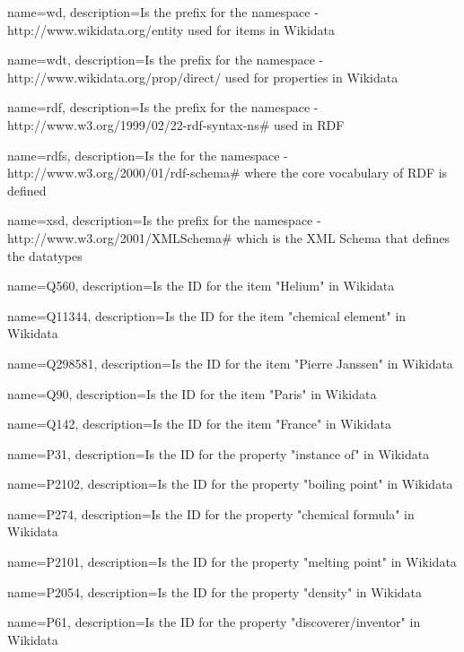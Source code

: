 \makeglossaries
{}
{
    name=wd,
    description={Is the prefix for the namespace - http://www.wikidata.org/entity used for items in Wikidata}
}

{
    name=wdt,
    description={Is the prefix for the namespace - http://www.wikidata.org/prop/direct/ used for properties in Wikidata}
}

{
    name=rdf,
    description={Is the prefix for the namespace - http://www.w3.org/1999/02/22-rdf-syntax-ns\# used in RDF}
}

{
    name=rdfs,
    description={Is the for the namespace - http://www.w3.org/2000/01/rdf-schema\# where the core vocabulary of RDF is defined}
}

{
    name=xsd,
    description={Is the prefix for the namespace - http://www.w3.org/2001/XMLSchema\# which is the XML Schema that defines the datatypes}
}

{
    name=Q560,
    description={Is the ID for the item "Helium" in Wikidata}
}

{
    name=Q11344,
    description={Is the ID for the item "chemical element" in Wikidata}
}

{
    name=Q298581,
    description={Is the ID for the item "Pierre Janssen" in Wikidata}
}

{
    name=Q90,
    description={Is the ID for the item "Paris" in Wikidata}
}

{
    name=Q142,
    description={Is the ID for the item "France" in Wikidata}
}

{
    name=P31,
    description={Is the ID for the property "instance of" in Wikidata}
}

{
    name=P2102,
    description={Is the ID for the property "boiling point" in Wikidata}
}

{
    name=P274,
    description={Is the ID for the property "chemical formula" in Wikidata}
}

{
    name=P2101,
    description={Is the ID for the property "melting point" in Wikidata}
}

{
    name=P2054,
    description={Is the ID for the property "density" in Wikidata}
}

{
    name=P61,
    description={Is the ID for the property "discoverer/inventor" in Wikidata}
}

